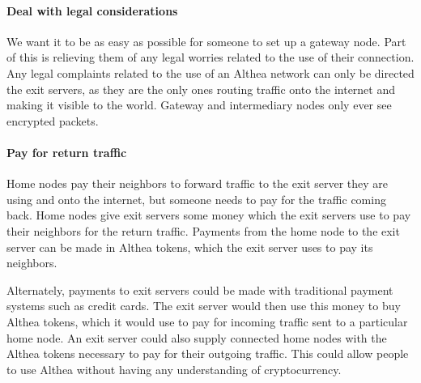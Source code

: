 \documentclass[11pt]{article}
\begin{document}
\paragraph{Deal with legal considerations}
We want it to be as easy as possible for someone to set up a gateway node. Part of this is relieving them of any legal worries related to the use of their connection. Any legal complaints related to the use of an Althea network can only be directed the exit servers, as they are the only ones routing traffic onto the internet and making it visible to the world. Gateway and intermediary nodes only ever see encrypted packets.

\paragraph{Pay for return traffic}
Home nodes pay their neighbors to forward traffic to the exit server they are using and onto the internet, but someone needs to pay for the traffic coming back. Home nodes give exit servers some money which the exit servers use to pay their neighbors for the return traffic. Payments from the home node to the exit server can be made in Althea tokens, which the exit server uses to pay its neighbors.

Alternately, payments to exit servers could be made with traditional payment systems such as credit cards. The exit server would then use this money to buy Althea tokens, which it would use to pay for incoming traffic sent to a particular home node. An exit server could also supply connected home nodes with the Althea tokens necessary to pay for their outgoing traffic. This could allow people to use Althea without having any understanding of cryptocurrency.
\end{document}
